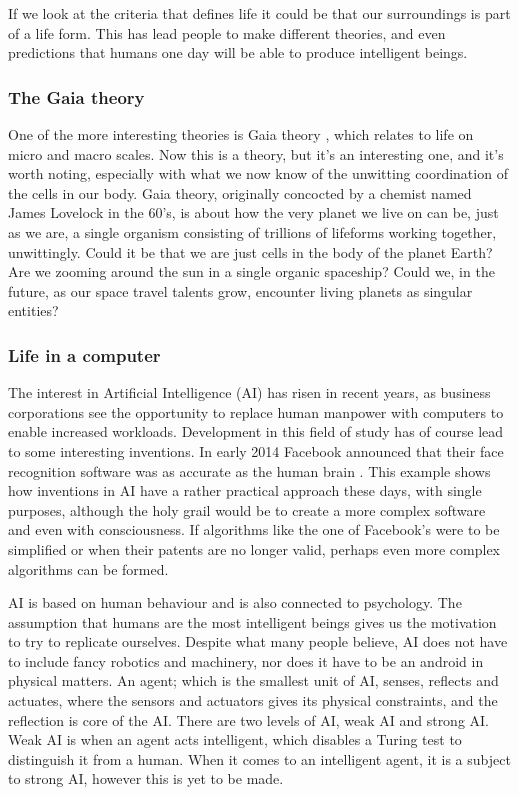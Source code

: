 If we look at the criteria that defines life it could be that our surroundings is part of a life form.
This has lead people to make different theories, and even predictions that humans one day will be able to produce intelligent beings.

\subsubsection*{The Gaia theory}
One of the more interesting theories is Gaia theory \cite{Lovelock}, which relates to life on micro and macro scales. Now this is a theory, but it's an interesting one, and it's worth noting, especially with what we now know of the unwitting coordination of the cells in our body.
Gaia theory, originally concocted by a chemist named James Lovelock in the 60's, is about how the very planet we live on can be, just as we are, a single organism consisting of trillions of lifeforms working together, unwittingly.
Could it be that we are just cells in the body of the planet Earth?
Are we zooming around the sun in a single organic spaceship?
Could we, in the future, as our space travel talents grow, encounter living planets as singular entities?



\subsubsection*{Life in a computer}
The interest in Artificial Intelligence (AI) has risen in recent years, as business corporations see the opportunity to replace human manpower with computers to enable increased workloads.
Development in this field of study has of course lead to some interesting inventions.
In early 2014 Facebook announced that their face recognition software was as accurate as the human brain \cite{facebook}.
This example shows how inventions in AI have a rather practical approach these days, with single purposes, although the holy grail would be to create a more complex software and even with consciousness.
If algorithms like the one of Facebook's were to be simplified or when their patents are no longer valid, perhaps even more complex algorithms can be formed.

AI is based on human behaviour and is also connected to psychology.
The assumption that humans are the most intelligent beings gives us the motivation to try to replicate ourselves.
Despite what many people believe, AI does not have to include fancy robotics and machinery, nor does it have to be an android in physical matters.
An agent; which is the smallest unit of AI, senses, reflects and actuates, where the sensors and actuators gives its physical constraints, and the reflection is core of the AI.
There are two levels of AI, weak AI and strong AI. Weak AI is when an agent acts intelligent, which disables a Turing test to distinguish it from a human.
When it comes to an intelligent agent, it is a subject to strong AI, however this is yet to be made.